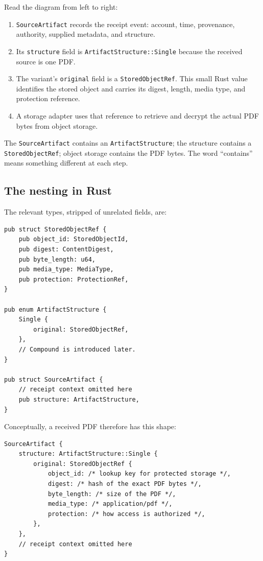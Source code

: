 \documentclass[11pt]{article}
\newcommand{\code}[1]{\texttt{#1}}
\begin{document}
Read the diagram from left to right:

\begin{enumerate}
  \item \code{SourceArtifact} records the receipt event: account, time, provenance, authority, supplied metadata, and structure.
  \item Its \code{structure} field is \code{ArtifactStructure::Single} because the received source is one PDF.
  \item The variant's \code{original} field is a \code{StoredObjectRef}. This small Rust value identifies the stored object and carries its digest, length, media type, and protection reference.
  \item A storage adapter uses that reference to retrieve and decrypt the actual PDF bytes from object storage.
\end{enumerate}

\begin{decisionbox}
The \code{SourceArtifact} contains an \code{ArtifactStructure}; the structure contains a \code{StoredObjectRef}; object storage contains the PDF bytes. The word ``contains'' means something different at each step.
\end{decisionbox}

\subsection{The nesting in Rust}

The relevant types, stripped of unrelated fields, are:

\begin{lstlisting}
pub struct StoredObjectRef {
    pub object_id: StoredObjectId,
    pub digest: ContentDigest,
    pub byte_length: u64,
    pub media_type: MediaType,
    pub protection: ProtectionRef,
}

pub enum ArtifactStructure {
    Single {
        original: StoredObjectRef,
    },
    // Compound is introduced later.
}

pub struct SourceArtifact {
    // receipt context omitted here
    pub structure: ArtifactStructure,
}
\end{lstlisting}

Conceptually, a received PDF therefore has this shape:

\begin{lstlisting}
SourceArtifact {
    structure: ArtifactStructure::Single {
        original: StoredObjectRef {
            object_id: /* lookup key for protected storage */,
            digest: /* hash of the exact PDF bytes */,
            byte_length: /* size of the PDF */,
            media_type: /* application/pdf */,
            protection: /* how access is authorized */,
        },
    },
    // receipt context omitted here
}
\end{lstlisting}
\end{document}
